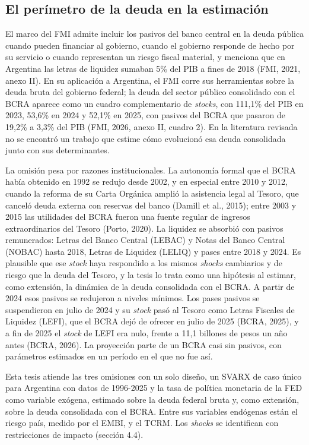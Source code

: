 \subsection{El perímetro de la deuda en la estimación}

El marco del FMI admite incluir los pasivos del banco central en la
deuda pública cuando pueden financiar al gobierno, cuando el gobierno
responde de hecho por su servicio o cuando representan un riesgo fiscal
material, y menciona que en Argentina las letras de liquidez sumaban 5\%
del PIB a fines de 2018 (FMI, 2021, anexo II). En su aplicación a
Argentina, el FMI corre sus herramientas sobre la deuda bruta del
gobierno federal; la deuda del sector público consolidado con el BCRA
aparece como un cuadro complementario de \emph{stocks}, con 111,1\% del
PIB en 2023, 53,6\% en 2024 y 52,1\% en 2025, con pasivos del BCRA que
pasaron de 19,2\% a 3,3\% del PIB (FMI, 2026, anexo II, cuadro 2). En la
literatura revisada no se encontró un trabajo que estime cómo evolucionó
esa deuda consolidada junto con sus determinantes.

La omisión pesa por razones institucionales. La autonomía formal que el
BCRA había obtenido en 1992 se redujo desde 2002, y en especial entre
2010 y 2012, cuando la reforma de su Carta Orgánica amplió la asistencia
legal al Tesoro, que canceló deuda externa con reservas del banco
(Damill et al., 2015); entre 2003 y 2015 las utilidades del BCRA fueron
una fuente regular de ingresos extraordinarios del Tesoro (Porto, 2020).
La liquidez se absorbió con pasivos remunerados: Letras del Banco
Central (LEBAC) y Notas del Banco Central (NOBAC) hasta 2018, Letras de
Liquidez (LELIQ) y pases entre 2018 y 2024. Es plausible que ese
\emph{stock} haya respondido a los mismos \emph{shocks} cambiarios y de
riesgo que la deuda del Tesoro, y la tesis lo trata como una hipótesis
al estimar, como extensión, la dinámica de la deuda consolidada con el
BCRA. A partir de 2024 esos pasivos se redujeron a niveles mínimos. Los
pases pasivos se suspendieron en julio de 2024 y su \emph{stock} pasó al
Tesoro como Letras Fiscales de Liquidez (LEFI), que el BCRA dejó de
ofrecer en julio de 2025 (BCRA, 2025), y a fin de 2025 el \emph{stock}
de LEFI era nulo, frente a 11,1 billones de pesos un año antes (BCRA,
2026). La proyección parte de un BCRA casi sin pasivos, con parámetros
estimados en un período en el que no fue así.

Esta tesis atiende las tres omisiones con un solo diseño, un SVARX de
caso único para Argentina con datos de 1996-2025 y la tasa de política
monetaria de la FED como variable exógena, estimado sobre la deuda
federal bruta y, como extensión, sobre la deuda consolidada con el BCRA.
Entre sus variables endógenas están el riesgo país, medido por el EMBI,
y el TCRM. Los \emph{shocks} se identifican con restricciones de impacto
(sección 4.4).

